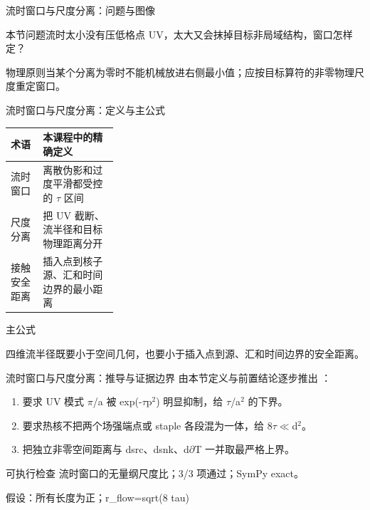 \begin{frame}[t]{流时窗口与尺度分离：问题与图像}
\footnotesize
\begin{block}{本节问题}流时太小没有压低格点 UV，太大又会抹掉目标非局域结构，窗口怎样定？\end{block}
\begin{block}{物理原则}\quad 当某个分离为零时不能机械放进右侧最小值；应按目标算符的非零物理尺度重定窗口。\end{block}
\end{frame}

\begin{frame}[t]{流时窗口与尺度分离：定义与主公式}
\footnotesize\begin{tabularx}{\linewidth}{p{0.30\linewidth}Y}
\toprule 术语 & 本课程中的精确定义\\\midrule
{} 流时窗口 & 离散伪影和过度平滑都受控的 \ensuremath{\tau} 区间\\
 尺度分离 & 把 UV 截断、流半径和目标物理距离分开\\
 接触安全距离 & 插入点到核子源、汇和时间边界的最小距离\\
\bottomrule\end{tabularx}\vspace{0.15cm}
\begin{block}{ 主公式}\centering{}\end{block}
四维流半径既要小于空间几何，也要小于插入点到源、汇和时间边界的安全距离。
\end{frame}

\begin{frame}[t]{流时窗口与尺度分离：推导与证据边界}
\footnotesize
{}\quad 由本节定义与前置结论逐步推出 ：
\begin{enumerate}
\item 要求 UV 模式 \ensuremath{\pi}/\allowbreak{}a 被 exp(-\ensuremath{\tau}p\ensuremath{^{2}}) 明显抑制，给 \ensuremath{\tau}/\allowbreak{}a\ensuremath{^{2}} 的下界。
\item 要求热核不把两个场强端点或 staple 各段混为一体，给 8\ensuremath{\tau}\ensuremath{\ll}d\ensuremath{^{2}}。
\item 把独立非零空间距离与 dsrc、dsnk、d\ensuremath{\partial}T 一并取最严格上界。
\end{enumerate}\begin{block}{可执行检查}
\quad 流时窗口的无量纲尺度比；3/3 项通过；SymPy exact。
\par\scriptsize 假设：所有长度为正；r\_flow=sqrt(8 tau)
\end{block}
\end{frame}

